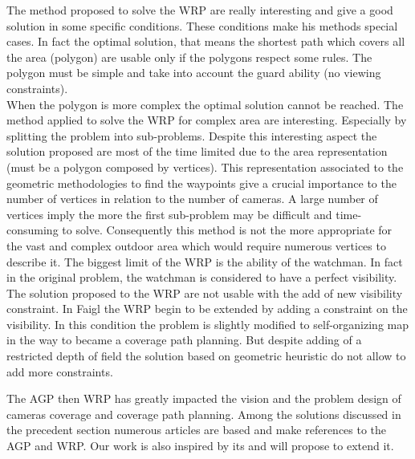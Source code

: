The method proposed to solve the WRP are really interesting and give a good solution in some specific conditions. These conditions make his methods special cases.
 In fact the optimal solution, that means the shortest path which covers all the area (polygon) are usable only if the polygons respect some rules. The polygon must be simple and take into account the guard ability (no viewing constraints).  \\
When the polygon is more complex the optimal solution cannot be reached. The method applied to solve the WRP for complex area are interesting. Especially by splitting the problem into sub-problems. Despite this interesting aspect the solution proposed are most of the time limited due to the area representation (must be a polygon composed by vertices). This representation associated to the geometric methodologies to find the waypoints give a crucial importance to the number of vertices in relation to the number of cameras. 
A large  number of vertices imply the more the first sub-problem may be difficult and time-consuming to solve.
Consequently this method is not the more appropriate for the vast and complex outdoor area which would require  numerous vertices to describe it.
 The biggest limit of the WRP is the ability of the watchman. In fact in the original problem, the watchman is considered to have a perfect visibility. The solution proposed to the WRP are not usable with the add of new visibility constraint. 
In Faigl \citep{235*faigl2010} the WRP begin to be extended by adding a constraint on the visibility. In this condition the problem is slightly modified to self-organizing map in the way to became a coverage path planning. But despite adding of a restricted  depth of field  the solution based on geometric heuristic do not allow to add more constraints.

The AGP then WRP has greatly impacted the vision and the problem design of cameras coverage and coverage path planning.  Among the solutions discussed in the precedent section numerous articles are based and make references to the AGP and WRP. Our work is also inspired by its and will propose to extend it.



 


%
%
%

